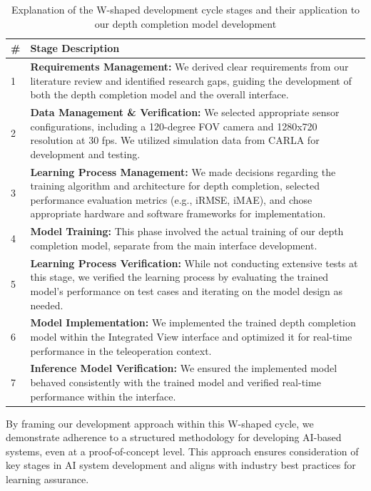 \begin{table}[h!]
    \centering
    \begin{tabular}{@{}p{1cm}p{13cm}@{}}
    \toprule
    \textbf{\#} & \textbf{Stage Description} \\
    \midrule
    1 & \textbf{Requirements Management:} We derived clear requirements from our literature review and identified research gaps, guiding the development of both the depth completion model and the overall interface. \\
    \midrule
    2 & \textbf{Data Management \& Verification:} We selected appropriate sensor configurations, including a 120-degree FOV camera and 1280x720 resolution at 30 fps. We utilized simulation data from CARLA for development and testing. \\
    \midrule
    3 & \textbf{Learning Process Management:} We made decisions regarding the training algorithm and architecture for depth completion, selected performance evaluation metrics (e.g., iRMSE, iMAE), and chose appropriate hardware and software frameworks for implementation. \\
    \midrule
    4 & \textbf{Model Training:} This phase involved the actual training of our depth completion model, separate from the main interface development. \\
    \midrule
    5 & \textbf{Learning Process Verification:} While not conducting extensive tests at this stage, we verified the learning process by evaluating the trained model's performance on test cases and iterating on the model design as needed. \\
    \midrule
    6 & \textbf{Model Implementation:} We implemented the trained depth completion model within the Integrated View interface and optimized it for real-time performance in the teleoperation context. \\
    \midrule
    7 & \textbf{Inference Model Verification:} We ensured the implemented model behaved consistently with the trained model and verified real-time performance within the interface. \\
    \bottomrule
    \end{tabular}
    \caption{Explanation of the W-shaped development cycle stages and their application to our depth completion model development}
    \label{table:wshaped_cycle}
    \end{table}

By framing our development approach within this W-shaped cycle, we demonstrate adherence to a structured methodology for developing \ac{AI}-based systems, even at a proof-of-concept level. This approach ensures consideration of key stages in \ac{AI} system development and aligns with industry best practices for learning assurance.

